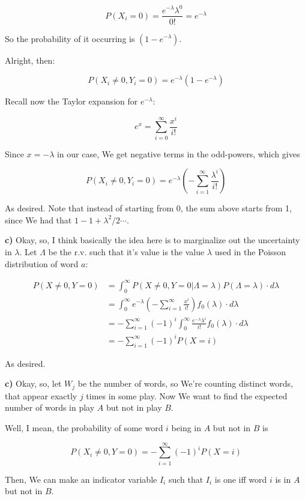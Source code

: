 \documentclass{article}
\begin{document}
			\[ P(X_i = 0) = \frac{e^{-\lambda}\lambda^0}{0!} = e^{-\lambda} \]
			
			So the probability of it occurring is $(1-e^{-\lambda})$.
			
			Alright, then:
			
			\[ P(X_i\neq 0, Y_i=0) = e^{-\lambda}(1-e^{-\lambda}) \]
			
			Recall now the Taylor expansion for $e^{-\lambda}$:
			
			\[ e^{x} = \sum^\infty_{i=0} \frac{x^i}{i!} \]			
			
			Since $x=-\lambda$ in our case, We get negative terms in the odd-powers, which gives
			
			\[ P(X_i\neq 0, Y_i=0) = e^{-\lambda}\left(-\sum^\infty_{i=1} \frac{\lambda^i}{i!}\right) \]
			
			As desired. Note that instead of starting from 0, the sum above starts from 1, since We had that $1-1+\lambda^2/2\cdots$.
			
			\textbf{c)} Okay, so, I think basically the idea here is to marginalize out the uncertainty in $\lambda$. Let $\Lambda$ be the r.v. such that it's value is the value $\lambda$ used in the Poisson distribution of word $a$:
			
			\begin{align*}	
			P(X\neq0, Y=0) &= \int^\infty_0 P(X\neq0, Y=0|\Lambda=\lambda)P(\Lambda=\lambda)\cdot d\lambda\\
			&= \int^\infty_0 e^{-\lambda}\left(-\sum^\infty_{i=1} \frac{x^i}{i!}\right)f_0(\lambda)\cdot d\lambda\\
			&= -\sum^\infty_{i=1}(-1)^i\int^\infty_0  \frac{e^{-\lambda}\lambda^i}{i!}f_0(\lambda)\cdot d\lambda\\
			&= -\sum^\infty_{i=1}(-1)^iP(X=i)			
			\end{align*}
			
			As desired.
			
			\textbf{c)} Okay, so, let $W_j$ be the number of words, so We're counting distinct words, that appear exactly $j$ times in some play. Now We want to find the expected number of words in play $A$ but not in play $B$.
			
			Well, I mean, the probability of some word $i$ being in $A$ but not in $B$ is
			
			\[ P(X_i\neq0, Y=0) = -\sum^\infty_{i=1}(-1)^iP(X=i)\]
			
			Then, We can make an indicator variable $I_i$ such that $I_i$ is one iff word $i$ is in $A$ but not in $B$. 
			
\end{document}
